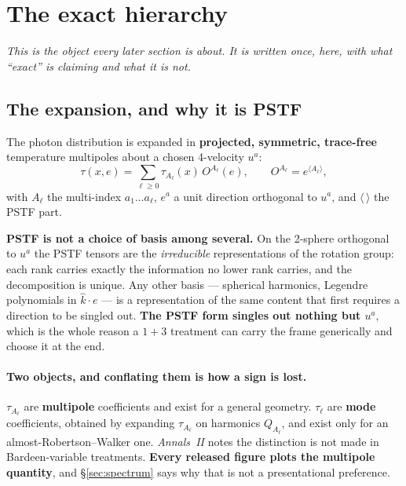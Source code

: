 %
%
\section{The exact hierarchy}
\label{sec:hierarchy}

\emph{This is the object every later section is about. It is written once,
here, with what ``exact'' is claiming and what it is not.}

\subsection{The expansion, and why it is PSTF}

The photon distribution is expanded in \textbf{projected, symmetric,
trace-free} temperature multipoles about a chosen 4-velocity $u^a$:
\begin{equation}
  \tau(x,e)=\sum_{\ell\ge0}\tau_{A_\ell}(x)\,O^{A_\ell}(e),
  \qquad
  O^{A_\ell}=e^{\langle A_\ell\rangle},
  \label{eq:pstf-expansion}
\end{equation}
with $A_\ell$ the multi-index $a_1\ldots a_\ell$, $e^a$ a unit direction
orthogonal to $u^a$, and $\langle\,\rangle$ the PSTF part.

\textbf{PSTF is not a choice of basis among several.} On the 2-sphere orthogonal to
$u^a$ the PSTF tensors are the \emph{irreducible} representations of the
rotation group: each rank carries exactly the information no lower rank
carries, and the decomposition is unique. Any other basis --- spherical
harmonics, Legendre polynomials in $\hat k\cdot e$ --- is a representation of
the same content that first requires a direction to be singled out.
\textbf{The PSTF form singles out nothing but $u^a$}, which is the whole
reason a $1+3$ treatment can carry the frame generically and choose it at the
end.

\paragraph{Two objects, and conflating them is how a sign is lost.}
$\tau_{A_\ell}$ are \textbf{multipole} coefficients and exist for a general
geometry. $\tau_\ell$ are \textbf{mode} coefficients, obtained by expanding
$\tau_{A_\ell}$ on harmonics $Q_{A_\ell}$, and exist only for an
almost-Robertson--Walker one. \emph{Annals~II} notes the distinction is not
made in Bardeen-variable treatments. \textbf{Every released figure plots the
multipole quantity}, and \S\ref{sec:spectrum} says why that is not a
presentational preference.

